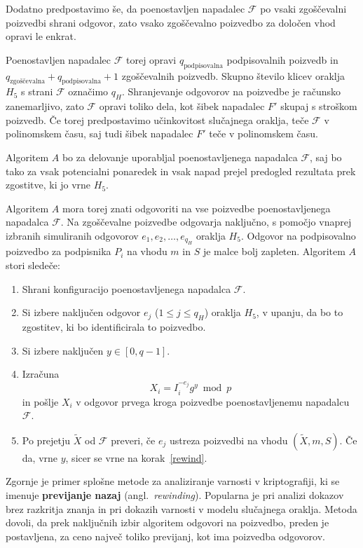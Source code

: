 \documentclass[isrm2, tisk]{fmfdelo}
\begin{document}
Dodatno predpostavimo še, da poenostavljen napadalec $\mathcal{F}$ po vsaki zgoščevalni poizvedbi
shrani odgovor, zato vsako zgoščevalno poizvedbo za določen vhod opravi le enkrat. 

Poenostavljen napadalec $\mathcal{F}$ torej opravi $q_{\text{podpisovalna}}$ podpisovalnih poizvedb
in $q_{\text{zgoščevalna}} + q_{\text{podpisovalna}} + 1$ zgoščevalnih poizvedb. Skupno število
klicev oraklja $H_5$ s strani $\mathcal{F}$ označimo $q_H$. Shranjevanje odgovorov na poizvedbe je
računsko zanemarljivo, zato $\mathcal{F}$ opravi toliko dela, kot šibek napadalec $F'$ skupaj s
stroškom poizvedb. Če torej predpostavimo učinkovitost slučajnega oraklja, teče $\mathcal{F}$ v
polinomskem času, saj tudi šibek napadalec $F'$ teče v polinomskem času.

Algoritem $A$ bo za delovanje uporabljal poenostavljenega napadalca $\mathcal{F}$, saj bo tako za
vsak potencialni ponaredek in vsak napad prejel predogled rezultata prek zgostitve, ki jo vrne $H_5$.

Algoritem $A$ mora torej znati odgovoriti na vse poizvedbe poenostavljenega napadalca $\mathcal{F}$.
Na zgoščevalne poizvedbe odgovarja naključno, s pomočjo vnaprej izbranih simuliranih odgovorov $e_1,
e_2, \dots, e_{q_H}$ oraklja $H_5$. Odgovor na podpisovalno poizvedbo za podpisnika $P_i$ na vhodu
$m$ in $S$ je malce bolj zapleten. Algoritem $A$ stori sledeče:
\begin{enumerate}
    \item Shrani konfiguracijo poenostavljenega napadalca $\mathcal{F}$.
    \item \label{rewind} Si izbere naključen odgovor $e_j$ ($1 \le j \le q_H$) oraklja $H_5$, 
        v upanju, da bo to zgostitev, ki bo identificirala to poizvedbo.
    \item Si izbere naključen $y \in [0, q - 1]$.
    \item Izračuna 
        $$
        X_i = I_i^{-e_j}g^y \bmod p
        $$
        in pošlje $X_i$ v odgovor prvega kroga poizvedbe poenostavljenemu napadalcu $\mathcal{F}$.
    \item Po prejetju $\tilde{X}$ od $\mathcal{F}$ preveri, če $e_j$ ustreza poizvedbi na vhodu
        $(\tilde{X}, m, S)$. Če da, vrne $y$, sicer se vrne na korak~\ref{rewind}.
\end{enumerate}
Zgornje je primer splošne metode za analiziranje varnosti v kriptografiji, ki se imenuje 
\textbf{previjanje nazaj} (angl.\ \textit{rewinding}). Popularna je pri analizi dokazov brez razkritja
znanja in pri dokazih varnosti v modelu slučajnega oraklja. Metoda dovoli, da prek naključnih izbir
algoritem odgovori na poizvedbo, preden je postavljena, za ceno največ toliko previjanj, kot ima
poizvedba odgovorov.
\end{document}
